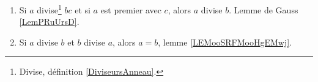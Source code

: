 	\label{THEMEooDivisibilite}
\begin{enumerate}
	\item
	      Si \( a\) divise\footnote{Divise, définition \ref{DiviseursAnneau}.} \( bc\) et si \( a\) est premier avec \( c\), alors \( a\) divise \( b\). Lemme de Gauss \ref{LemPRuUrsD}.
	\item
	      Si \( a\) divise \( b\) et \( b\) divise \( a\), alors \( a=b\), lemme \ref{LEMooSRFMooHgEMwj}.
\end{enumerate}
